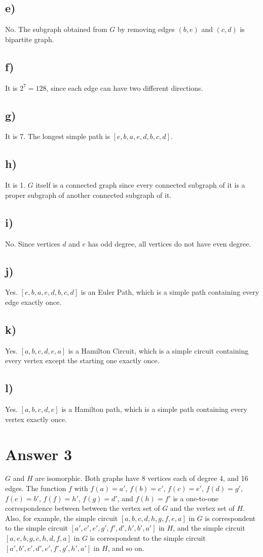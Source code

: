 \documentclass[12pt]{article}
\begin{document}
\subsection*{e)}
No. The subgraph obtained from $G$ by removing edges $(b, e)$ and $(c, d)$ is bipartite graph.

\subsection*{f)}
It is $2^7 = 128$, since each edge can have two different directions.

\subsection*{g)}
It is 7. The longest simple path is $[e, b, a, e, d, b, c, d]$.

\subsection*{h)}
It is 1. $G$ itself is a connected graph since every connected subgraph of it is a proper subgraph of another connected subgraph of it.

\subsection*{i)}
No. Since vertices $d$ and $e$ has odd degree, all vertices do not have even degree.

\subsection*{j)}
Yes. $[e, b, a, e, d, b, c, d]$ is an Euler Path, which is a simple path containing every edge exactly once.

\subsection*{k)}
Yes. $[a, b, c, d, e, a]$ is a Hamilton Circuit, which is a simple circuit containing every vertex except the starting one exactly once.

\subsection*{l)}
Yes. $[a, b, c, d, e]$ is a Hamilton path, which is a simple path containing every vertex exactly once.

\section*{Answer 3}
$G$ and $H$ are isomorphic. Both graphs have 8 vertices each of degree 4, and 16 edges. The function $f$ with $f(a) = a'$, $f(b) = c'$, $f(c) = e'$, $f(d) = g'$, $f(e) = b'$, $f(f) = h'$, $f(g) = d'$, and $f(h) = f'$ is a one-to-one correspondence between between the vertex set of $G$ and the vertex set of $H$. Also, for example, the simple circuit $[a, b, c, d, h, g, f, e, a]$ in $G$ is correspondent to the simple circuit $[a', c', e', g', f', d', h', b', a']$ in $H$, and the simple circuit $[a, e, b, g, c, h, d, f, a]$ in $G$ is correspondent to the simple circuit $[a', b', c', d', e', f', g', h', a']$ in $H$, and so on.
\end{document}
